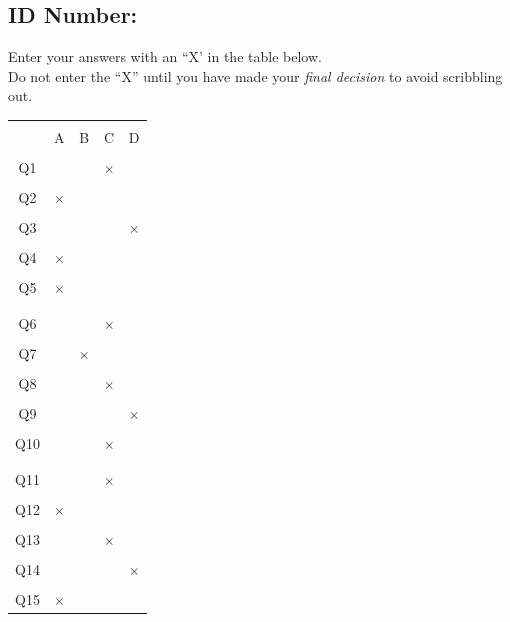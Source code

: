 \documentclass[12pt]{article}
\begin{document}
\subsection*{ID Number:\quad\underline{\hspace{10cm}}\\[0.5cm]}

Enter your answers with an ``X' in the table below.\\[0.3cm]
Do not enter the ``X'' until you have made your \emph{final decision} to avoid scribbling out.\\[0.3cm]
\begin{large}
\begin{center}
\begin{tabular}{|c|c|c|c|c|}
\hline
&&&&\\[-0.4cm]
 & A & B & C & D \\
\hline
&&&&\\[-0.4cm]
Q1 &&&$\times$& \\
\hline
&&&&\\[-0.4cm]
Q2 &$\times$&&& \\
\hline
&&&&\\[-0.4cm]
Q3 &&&&$\times$ \\
\hline
&&&&\\[-0.4cm]
Q4 &$\times$&&& \\
\hline
&&&&\\[-0.4cm]
Q5 &$\times$&&& \\
\hline
\multicolumn{5}{c}{}\\[-0.3cm]
\hline
&&&&\\[-0.4cm]
Q6 &&&$\times$& \\
\hline
&&&&\\[-0.4cm]
Q7 &&$\times$&& \\
\hline
&&&&\\[-0.4cm]
Q8 &&&$\times$& \\
\hline
&&&&\\[-0.4cm]
Q9 &&&&$\times$ \\
\hline
&&&&\\[-0.4cm]
Q10 &&&$\times$& \\
\hline
\multicolumn{5}{c}{}\\[-0.3cm]
\hline
&&&&\\[-0.4cm]
Q11 &&&$\times$& \\
\hline
&&&&\\[-0.4cm]
Q12 &$\times$&&& \\
\hline
&&&&\\[-0.4cm]
Q13 &&&$\times$& \\
\hline
&&&&\\[-0.4cm]
Q14 &&&&$\times$ \\
\hline
&&&&\\[-0.4cm]
Q15 &$\times$&&& \\
\hline
\end{tabular}
\end{center}
\end{large}
\end{document}
